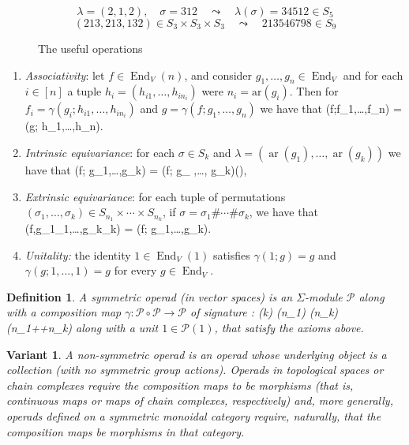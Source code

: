 \documentclass[fleqn,a4paper, twoside]{article}
\makeatletter
\newcommand{\0}{\langle 0\rangle}
\newcommand{\End}{\operatorname{End}}
\newcommand{\ari}{\operatorname{ar}}
\newenvironment{tenumerate}{
 \begin{enumerate}
  \setlength{\itemsep}{0pt}
  \setlength{\parskip}{0pt}
}{\end{enumerate}}
\let\[\@undefined
\DeclareRobustCommand{\[}{\begin{equation}}%
\let\]\@undefined
\DeclareRobustCommand{\]}{\end{equation}}%
\theoremstyle{mytheorem}
\theoremstyle{introthm}
\theoremstyle{mydefinition}
\newtheorem{definition}[theorem]{Definition}
\newtheorem{variante}[theorem]{Variant}
\theoremstyle{mydefinition2}
\theoremstyle{plain} %
\newcommand{\?}{\,?\,}
\newcommand{\PP}{{\mathcal{P}}}
\theoremstyle{mytheorem}
\theoremstyle{plain} %
\makeatother
\begin{document}
\begin{figure}
$$\lambda = (2,1,2), \quad \sigma = 312
	\quad \leadsto \quad \lambda(\sigma) =  34512 \in S_5
	$$
	$$
	(213,213,132)\in S_3\times S_3\times S_3 \quad \leadsto \quad 213546798\in S_9 $$
\caption{The useful operations}
\label{fig:1}
\end{figure}

\begin{tenumerate}
\item \emph{Associativity}: let $f\in \End_V(n)$,
and consider $g_1,\ldots,g_n \in \End_V$ and
for each $i\in [n]$ a tuple $h_i= (h_{i1},\ldots,h_{i n_i})$
were $n_i= \mathrm{ar}(g_i)$. Then for
$f_i = \gamma(g_i; h_{i1},\ldots,h_{in_i})$ 
and $g= \gamma(f; g_1,\ldots,g_n)$ we have
that
\[ \gamma(f;f_1,\ldots,f_n) = 
	\gamma(g; h_1,\ldots,h_n).\]
\item \emph{Intrinsic equivariance}: for
each $\sigma\in S_k$ and $\lambda = (\ari(g_1),\ldots,\ari(g_k))$ we have that
\[ \gamma(f\sigma; g_1,\ldots,g_k) = 	
	\gamma(f; g_{} ,\ldots, 
		g_{\sigma k})\lambda(\sigma),\]
	
\item \emph{Extrinsic equivariance}: for each
tuple of permutations $(\sigma_1,\ldots,\sigma_k) \in S_{n_1} \times
\cdots \times S_{n_k}$, if $\sigma = \sigma_1\#\cdots\#\sigma_k$, we have that
\[\gamma(f,g_1\sigma_1,\ldots,g_k\sigma_k) = 
	\gamma(f; g_1,\ldots,g_k)\sigma.\]
\item \emph{Unitality:} the identity $1\in\End_V(1)$
satisfies $\gamma(1;g) = g$ and $\gamma(g;1,\ldots,1) = g$ for every $g\in\End_V$.
\end{tenumerate}

\begin{definition} 
A symmetric operad (in vector spaces) is an
$\Sigma$-module $\PP$ along with a composition
map $\gamma : \PP\circ \PP \longrightarrow \PP$
of signature
\[\gamma : \PP(k)\otimes 
	\PP(n_1) \otimes \cdots \otimes \PP(n_k)
	 	\longrightarrow \PP(n_1+\cdots+n_k)\]
along with a unit $1\in \PP(1)$, that satisfy
the axioms above. 
\end{definition} 

\begin{variante} A non-symmetric operad is
an operad whose underlying object is a collection
(with no symmetric group actions). Operads in
topological spaces or chain complexes require
the composition maps to be morphisms (that is,
continuous maps or maps of chain complexes,
respectively) and, more generally, operads 
defined on a symmetric monoidal category
require, naturally, that the composition
maps be morphisms in that category. 
\end{variante}
\end{document}
